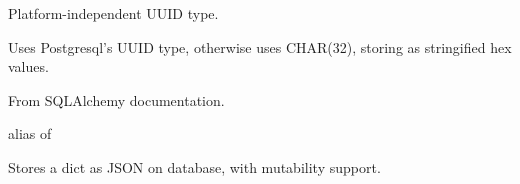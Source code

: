 \documentclass[a4paper,12pt,english]{sphinxmanual}
\begin{document}
\begin{fulllineitems}
\label{api:abilian.core.sqlalchemy.UUID}
Platform-independent UUID type.

Uses Postgresql's UUID type, otherwise uses
CHAR(32), storing as stringified hex values.

From SQLAlchemy documentation.

\begin{fulllineitems}
\label{api:abilian.core.sqlalchemy.UUID.impl}
alias of 

\end{fulllineitems}


\begin{fulllineitems}
\label{api:abilian.core.sqlalchemy.UUID.load_dialect_impl}
\end{fulllineitems}


\begin{fulllineitems}
\label{api:abilian.core.sqlalchemy.UUID.process_bind_param}
\end{fulllineitems}


\begin{fulllineitems}
\label{api:abilian.core.sqlalchemy.UUID.process_result_value}
\end{fulllineitems}


\end{fulllineitems}


\begin{fulllineitems}
\label{api:abilian.core.sqlalchemy.JSONDict}
Stores a dict as JSON on database, with mutability support.

\end{fulllineitems}
\end{document}
